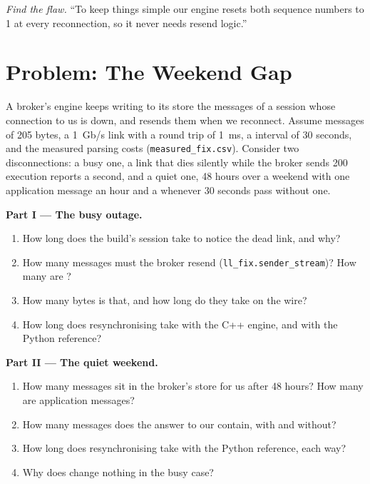 \begin{exercise}[$\star\star\star$]\label{exo:ll:protocols-i-fix:8}
\emph{Find the flaw.} ``To keep things simple our engine resets both sequence numbers to 1 at every reconnection, so it never
needs resend logic.''
\end{exercise}

\section{Problem: The Weekend Gap}

\begin{problem}\label{pb:ll:protocols-i-fix:1}
A broker's engine keeps writing to its store the messages of a session whose connection to us is down, and resends them when
we reconnect. Assume messages of 205 bytes, a 1~Gb/s link with a round trip of \qty{1}{\milli\second}, a  interval of
30 seconds, and the measured parsing costs (\texttt{measured\_fix.csv}). Consider two disconnections: a busy one, a link that
dies silently while the broker sends 200 execution reports a second, and a quiet one, 48 hours over a weekend with one
application message an hour and a  whenever 30 seconds pass without one.

\medskip\noindent\textbf{Part I --- The busy outage.}
\begin{enumerate}
\item How long does the build's session take to notice the dead link, and why?
\item How many messages must the broker resend (\texttt{ll\_fix.sender\_stream})? How many are ?
\item How many bytes is that, and how long do they take on the wire?
\item How long does resynchronising take with the C++ engine, and with the Python reference?
\end{enumerate}

\medskip\noindent\textbf{Part II --- The quiet weekend.}
\begin{enumerate}[resume]
\item How many messages sit in the broker's store for us after 48 hours? How many are application messages?
\item How many messages does the answer to our  contain, with  and without?
\item How long does resynchronising take with the Python reference, each way?
\item Why does  change nothing in the busy case?
\end{enumerate}


\end{problem}
